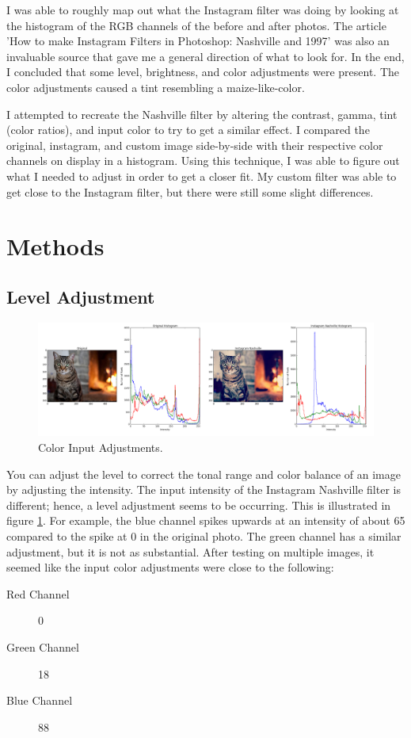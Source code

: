 \documentclass{article}
\begin{document}
I was able to roughly map out what the Instagram filter was doing by
looking at the histogram of the RGB channels of the before and after photos. The article  'How to make Instagram Filters in Photoshop: Nashville and 1997' was also an invaluable source that gave me a general direction of what to look for. In the end, I concluded that some level, brightness, and color adjustments were present. The color adjustments caused a tint resembling a maize-like-color.

I attempted to recreate the Nashville filter by altering the contrast, gamma, tint (color ratios), and input color to try to get a similar effect. I compared the original, instagram, and custom image side-by-side with their respective color channels on display in a histogram. Using this technique, I was able to figure out what I needed to adjust in order to get a closer fit. My custom filter was able to get close to the Instagram filter, but there were still some slight differences.

\pagebreak

\section{Methods}

\subsection{Level Adjustment}

\begin{figure}[H]
\includegraphics[width=\linewidth]{color_input_adjustment.png}
\caption{Color Input Adjustments.}
\label{fig:colorInputAdjustment}
\end{figure}

You can adjust the level to correct the tonal range and color balance of an image by adjusting the intensity. \cite{website:levels} The input intensity of the Instagram Nashville filter is different; hence, a level adjustment seems to be occurring. This is illustrated in figure \ref{fig:colorInputAdjustment}. For example, the blue channel spikes upwards at an intensity of about 65 compared to the spike at 0 in the original photo. The green channel has a similar adjustment, but it is not as substantial. After testing on multiple images, it seemed like the input color adjustments were close to the following: \cite{website:photodoto}
\begin{description}
\item[Red Channel] 0
\item[Green Channel] 18
\item[Blue Channel] 88
\end{description}
\end{document}

